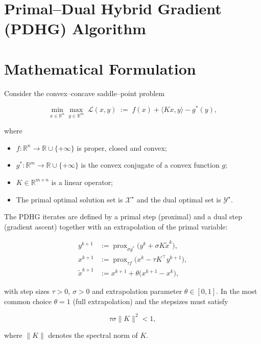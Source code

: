 \documentclass{article}
\newcommand{\prox}{\operatorname{prox}}
\begin{document}
\section*{Primal–Dual Hybrid Gradient (PDHG) Algorithm}

\section*{Mathematical Formulation}
Consider the convex–concave saddle–point problem  

\[
\min_{x\in\mathbb{R}^n}\max_{y\in\mathbb{R}^m}
\;\mathcal{L}(x,y)\;:=\;f(x)+\langle Kx , y\rangle-g^{*}(y),
\tag{1}
\]

where  

\begin{itemize}
    \item $f:\mathbb{R}^{n}\rightarrow\mathbb{R}\cup\{+\infty\}$ is proper, closed and convex;
    \item $g^{*}:\mathbb{R}^{m}\rightarrow\mathbb{R}\cup\{+\infty\}$ is the convex conjugate of a convex function $g$;
    \item $K\in\mathbb{R}^{m\times n}$ is a linear operator;
    \item The primal optimal solution set is $\mathcal{X}^{\star}$ and the dual optimal set is $\mathcal{Y}^{\star}$.
\end{itemize}

The PDHG iterates are defined by a primal step (proximal) and a dual step (gradient ascent) together with an extrapolation of the primal variable:

\[
\boxed{
\begin{aligned}
y^{k+1} &:= \prox_{\sigma g^{*}}\!\bigl(y^{k}+\sigma K\tilde{x}^{k}\bigr), \\
x^{k+1} &:= \prox_{\tau f}\!\bigl(x^{k}-\tau K^{\top}y^{k+1}\bigr),\\
\tilde{x}^{k+1} &:= x^{k+1}+ \theta\bigl(x^{k+1}-x^{k}\bigr),
\end{aligned}}
\tag{2}
\]

with step sizes $\tau>0$, $\sigma>0$ and extrapolation parameter $\theta\in[0,1]$.  
In the most common choice $\theta=1$ (full extrapolation) and the stepsizes must satisfy  

\[
\tau\sigma\|K\|^{2}<1,
\tag{3}
\]

where $\|K\|$ denotes the spectral norm of $K$.
\end{document}
